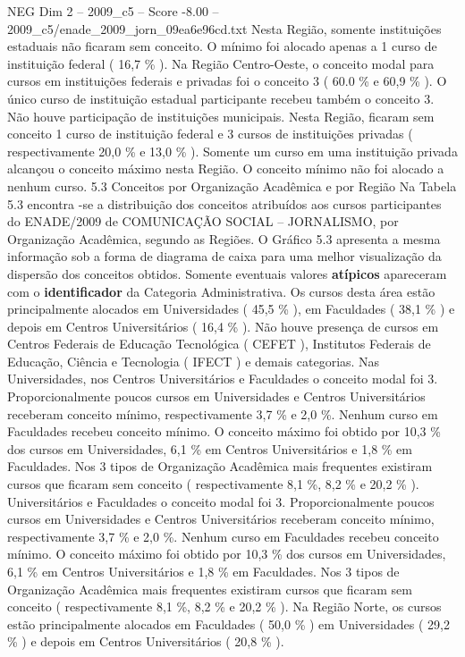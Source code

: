 \begin{textsample}{NEG Dim 2 – 2009\_c5 – Score -8.00 – 2009\_c5/enade\_2009\_jorn\_09ea6e96cd.txt}
Nesta Região, somente instituições estaduais não ficaram sem conceito.
O mínimo foi alocado apenas a 1 curso de instituição federal ( 16,7 \% ).
Na Região Centro-Oeste, o conceito modal para cursos em instituições federais e privadas foi o conceito 3 ( 60.0 \% e 60,9 \% ).
O único curso de instituição estadual participante recebeu também o conceito 3.
Não houve participação de instituições municipais.
Nesta Região, ficaram sem conceito 1 curso de instituição federal e 3 cursos de instituições privadas ( respectivamente 20,0 \% e 13,0 \% ).
Somente um curso em uma instituição privada alcançou o conceito máximo nesta Região.
O conceito mínimo não foi alocado a nenhum curso. 5.3 Conceitos por Organização Acadêmica e por Região Na Tabela 5.3 encontra -se a distribuição dos conceitos atribuídos aos cursos participantes do ENADE/2009 de COMUNICAÇÃO SOCIAL – JORNALISMO, por Organização Acadêmica, segundo as Regiões.
O Gráfico 5.3 apresenta a mesma informação sob a forma de diagrama de caixa para uma melhor visualização da dispersão dos conceitos obtidos.
Somente eventuais valores \textbf{atípicos} apareceram com o \textbf{identificador} da Categoria Administrativa.
Os cursos desta área estão principalmente alocados em Universidades ( 45,5 \% ), em Faculdades ( 38,1 \% ) e depois em Centros Universitários ( 16,4 \% ).
Não houve presença de cursos em Centros Federais de Educação Tecnológica ( CEFET ), Institutos Federais de Educação, Ciência e Tecnologia ( IFECT ) e demais categorias.
Nas Universidades, nos Centros Universitários e Faculdades o conceito modal foi 3.
Proporcionalmente poucos cursos em Universidades e Centros Universitários receberam conceito mínimo, respectivamente 3,7 \% e 2,0 \%.
Nenhum curso em Faculdades recebeu conceito mínimo.
O conceito máximo foi obtido por 10,3 \% dos cursos em Universidades, 6,1 \% em Centros Universitários e 1,8 \% em Faculdades.
Nos 3 tipos de Organização Acadêmica mais frequentes existiram cursos que ficaram sem conceito ( respectivamente 8,1 \%, 8,2 \% e 20,2 \% ).
Universitários e Faculdades o conceito modal foi 3.
Proporcionalmente poucos cursos em Universidades e Centros Universitários receberam conceito mínimo, respectivamente 3,7 \% e 2,0 \%.
Nenhum curso em Faculdades recebeu conceito mínimo.
O conceito máximo foi obtido por 10,3 \% dos cursos em Universidades, 6,1 \% em Centros Universitários e 1,8 \% em Faculdades.
Nos 3 tipos de Organização Acadêmica mais frequentes existiram cursos que ficaram sem conceito ( respectivamente 8,1 \%, 8,2 \% e 20,2 \% ).
Na Região Norte, os cursos estão principalmente alocados em Faculdades ( 50,0 \% ) em Universidades ( 29,2 \% ) e depois em Centros Universitários ( 20,8 \% ).

\end{textsample}

